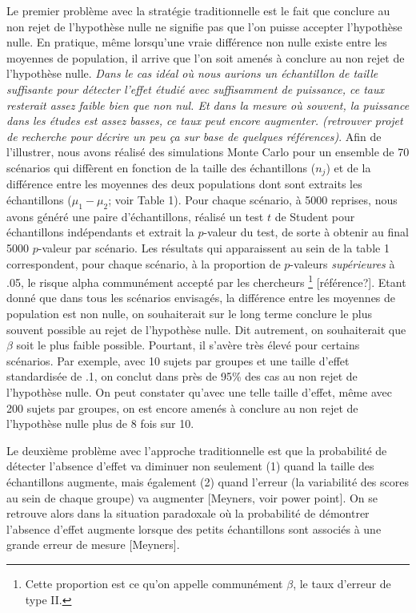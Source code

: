 \documentclass[
  english,
  man]{apa6}
\begin{document}
Le premier problème avec la stratégie traditionnelle est le fait que conclure au non rejet de l'hypothèse nulle ne signifie pas que l'on puisse accepter l'hypothèse nulle. En pratique, même lorsqu'une vraie différence non nulle existe entre les moyennes de population, il arrive que l'on soit amenés à conclure au non rejet de l'hypothèse nulle. \emph{Dans le cas idéal où nous aurions un échantillon de taille suffisante pour détecter l'effet étudié avec suffisamment de puissance, ce taux resterait assez faible bien que non nul. Et dans la mesure où souvent, la puissance dans les études est assez basses, ce taux peut encore augmenter. (retrouver projet de recherche pour décrire un peu ça sur base de quelques références)}. Afin de l'illustrer, nous avons réalisé des simulations Monte Carlo pour un ensemble de 70 scénarios qui diffèrent en fonction de la taille des échantillons (\(n_j\)) et de la différence entre les moyennes des deux populations dont sont extraits les échantillons (\(\mu_1-\mu_2\); voir Table 1). Pour chaque scénario, à 5000 reprises, nous avons généré une paire d'échantillons, réalisé un test \(t\) de Student pour échantillons indépendants et extrait la \(p\)-valeur du test, de sorte à obtenir au final 5000 \(p\)-valeur par scénario. Les résultats qui apparaissent au sein de la table 1 correspondent, pour chaque scénario, à la proportion de \(p\)-valeurs \emph{supérieures} à .05, le risque alpha communément accepté par les chercheurs \footnote{Cette proportion est ce qu'on appelle communément $\beta$, le taux d'erreur de type II.} {[}référence?{]}. Etant donné que dans tous les scénarios envisagés, la différence entre les moyennes de population est non nulle, on souhaiterait sur le long terme conclure le plus souvent possible au rejet de l'hypothèse nulle. Dit autrement, on souhaiterait que \(\beta\) soit le plus faible possible. Pourtant, il s'avère très élevé pour certains scénarios. Par exemple, avec 10 sujets par groupes et une taille d'effet standardisée de .1, on conclut dans près de 95\% des cas au non rejet de l'hypothèse nulle. On peut constater qu'avec une telle taille d'effet, même avec 200 sujets par groupes, on est encore amenés à conclure au non rejet de l'hypothèse nulle plus de 8 fois sur 10.

Le deuxième problème avec l'approche traditionnelle est que la probabilité de détecter l'absence d'effet va diminuer non seulement (1) quand la taille des échantillons augmente, mais également (2) quand l'erreur (la variabilité des scores au sein de chaque groupe) va augmenter {[}Meyners, voir power point{]}. On se retrouve alors dans la situation paradoxale où la probabilité de démontrer l'absence d'effet augmente lorsque des petits échantillons sont associés à une grande erreur de mesure {[}Meyners{]}.
\end{document}
